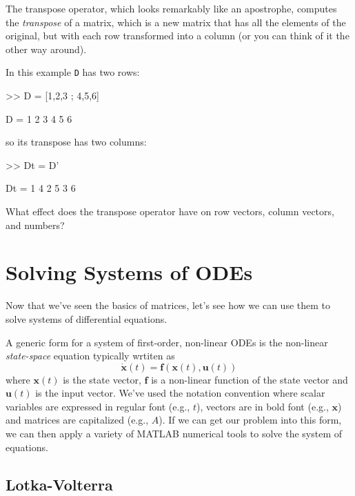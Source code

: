 The transpose operator, which looks remarkably like an apostrophe,
computes the \emph{transpose} of a matrix, which is a new matrix
that has all the elements of the original, but with each row
transformed into a column (or you can think of it the other way around).


In this example \lstinline{D} has two rows:

\begin{code}
>> D = [1,2,3 ; 4,5,6]

D =  1     2     3
     4     5     6
\end{code}
so its transpose has two columns:

\begin{code}
>> Dt = D'

Dt = 1     4
     2     5
     3     6
\end{code}

\begin{ex}
What effect does the transpose operator
have on row vectors, column vectors, and numbers?
\end{ex}


\section{Solving Systems of ODEs}

Now that we've seen the basics of matrices, let's see how we can use them to solve systems of differential equations.

A generic form for a system of first-order, non-linear ODEs is the non-linear \emph{state-space} equation typically wrtiten as
\begin{equation} \label{e:nonlinearstatespace}
\dot{\mathbf{x}}(t) = \mathbf{f}(\mathbf{x}(t), \mathbf{u}(t))
\end{equation}
where \( \mathbf{x}(t) \) is the state vector, \( \mathbf{f} \) is a non-linear function of the state vector and \( \mathbf{u}(t) \) is the input vector.  We've used the notation convention where scalar variables are expressed in regular font (e.g., $t$), vectors are in bold font (e.g., $\mathbf{x}$) and matrices are capitalized (e.g., $A$).  If we can get our problem into this form, we can then apply a variety of MATLAB numerical tools to solve the system of equations.

\subsection{Lotka-Volterra}
\label{lotka}

